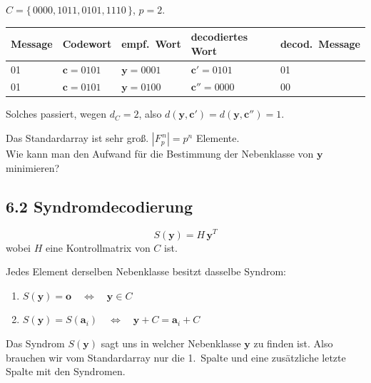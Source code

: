 \begin{beispiel}[Fortsetzung]
$C = \{\, 0000, 1011, 0101, 1110 \,\}$, $p = 2$.

\begin{center}
\begin{tabular}{lllll}
\toprule
Message & Codewort & empf.\ Wort & decodiertes Wort & decod.\ Message\\
\midrule
01 & $\mathbf{c} = 0101$ & $\mathbf{y} = 0001$ & $\mathbf{c}' = 0101$ & 01\\
01 & $\mathbf{c} = 0101$ & $\mathbf{y} = 0100$ & $\mathbf{c}'' = 0000$ & 00\\
\bottomrule
\end{tabular}
\end{center}
Solches passiert, wegen $d_C = 2$, also $d(\mathbf{y},\mathbf{c}') = d(\mathbf{y},\mathbf{c}'') = 1$.
\end{beispiel}

\begin{bemerkung}[Problem]
Das Standardarray ist sehr groß. $|F_p^{\,n}| = p^n$ Elemente.\\
Wie kann man den Aufwand für die Bestimmung der Nebenklasse von $\mathbf{y}$ minimieren?
\end{bemerkung}

\subsection{6.2 Syndromdecodierung}

\begin{definition}
\[ S(\mathbf{y}) = H\,\mathbf{y}^T \]
wobei $H$ eine Kontrollmatrix von $C$ ist.
\end{definition}

\begin{satz}
Jedes Element derselben Nebenklasse besitzt dasselbe Syndrom:
\begin{enumerate}[label=(\arabic*)]
  \item $S(\mathbf{y}) = \mathbf{o} \quad\Leftrightarrow\quad \mathbf{y} \in C$
  \item $S(\mathbf{y}) = S(\mathbf{a}_i) \quad\Leftrightarrow\quad \mathbf{y} + C = \mathbf{a}_i + C$
\end{enumerate}
Das Syndrom $S(\mathbf{y})$ sagt uns in welcher Nebenklasse $\mathbf{y}$ zu finden ist.
Also brauchen wir vom Standardarray nur die 1.\ Spalte und eine zusätzliche letzte Spalte mit den Syndromen.
\end{satz}

